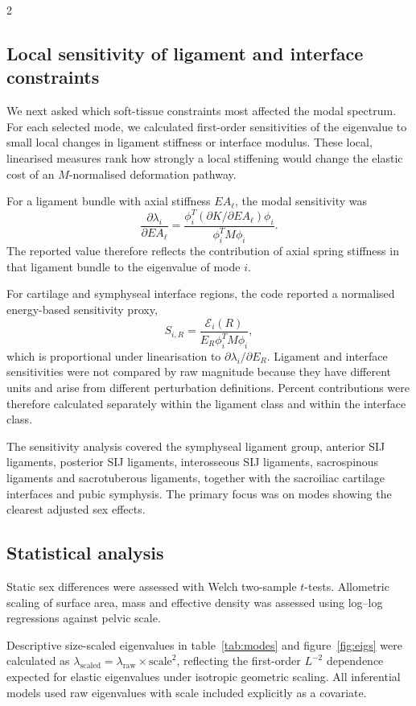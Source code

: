 \documentclass[openacc]{rsproca_new}
\begin{document}
\begin{multicols}{2}
\subsection{Local sensitivity of ligament and interface constraints}

We next asked which soft-tissue constraints most affected the modal spectrum. For each selected mode, we calculated first-order sensitivities of the eigenvalue to small local changes in ligament stiffness or interface modulus. These local, linearised measures rank how strongly a local stiffening would change the elastic cost of an $M$-normalised deformation pathway.

For a ligament bundle with axial stiffness $EA_{\ell}$, the modal sensitivity was
\[
\frac{\partial \lambda_i}{\partial EA_{\ell}} =
\frac{\phi_i^{T}(\partial K/\partial EA_{\ell})\phi_i}
{\phi_i^{T}M\phi_i}.
\]
The reported value therefore reflects the contribution of axial spring stiffness in that ligament bundle to the eigenvalue of mode $i$.

For cartilage and symphyseal interface regions, the code reported a normalised energy-based sensitivity proxy,
\[
S_{i,R} =
\frac{\mathcal{E}_{i}(R)}
{E_R \phi_i^{T}M\phi_i},
\]
which is proportional under linearisation to $\partial \lambda_i/\partial E_R$. Ligament and interface sensitivities were not compared by raw magnitude because they have different units and arise from different perturbation definitions. Percent contributions were therefore calculated separately within the ligament class and within the interface class.

The sensitivity analysis covered the symphyseal ligament group, anterior SIJ ligaments, posterior SIJ ligaments, interosseous SIJ ligaments, sacrospinous ligaments and sacrotuberous ligaments, together with the sacroiliac cartilage interfaces and pubic symphysis. The primary focus was on modes showing the clearest adjusted sex effects.

\subsection{Statistical analysis}

Static sex differences were assessed with Welch two-sample $t$-tests. Allometric scaling of surface area, mass and effective density was assessed using log--log regressions against pelvic scale.

Descriptive size-scaled eigenvalues in table~\ref{tab:modes} and figure~\ref{fig:eigs} were calculated as $\lambda_{\mathrm{scaled}}=\lambda_{\mathrm{raw}}\times \mathrm{scale}^{2}$, reflecting the first-order $L^{-2}$ dependence expected for elastic eigenvalues under isotropic geometric scaling. All inferential models used raw eigenvalues with scale included explicitly as a covariate.


\end{multicols}
\end{document}
